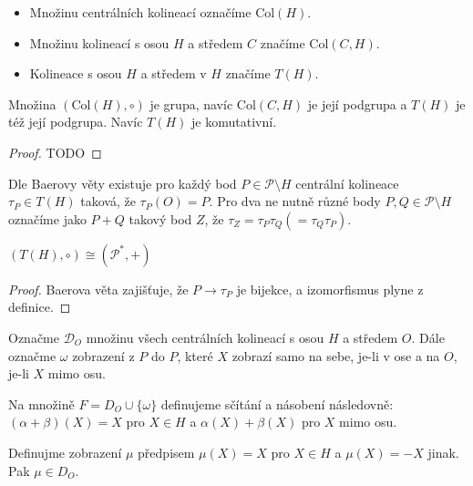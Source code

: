 \begin{definition}
    \begin{itemize}
        \item Množinu centrálních kolineací označíme $\mathrm{Col}(H)$.
        \item Množinu kolineací s osou $H$ a středem $C$ značíme $\mathrm{Col}(C,H)$.
        \item Kolineace s osou $H$ a středem v $H$ značíme $T(H)$.
    \end{itemize}
\end{definition}
\begin{theorem}
    Množina $(\mathrm{Col}(H), \circ)$ je grupa, navíc $\mathrm{Col}(C,H)$ je její podgrupa a $T(H)$ je též její podgrupa.
    Navíc $T(H)$ je komutativní.
\end{theorem}
\begin{proof}
    TODO
\end{proof}
\begin{definition}
    Dle Baerovy věty existuje pro každý bod $P\in\mathcal{P}\setminus H$ centrální kolineace $\tau_P\in T(H)$ taková, že $\tau_P(O)=P$.
    Pro dva ne nutně různé body $P,Q\in\mathcal{P}\setminus H$ označíme jako $P+Q$ takový bod $Z$, že $\tau_Z=\tau_P\tau_Q(=\tau_Q\tau_P)$.
\end{definition}
\begin{theorem}
    $(T(H),\circ)\cong(\mathcal{P}^*,+)$
\end{theorem}
\begin{proof}
    Baerova věta zajišťuje, že $P\rightarrow \tau_P$ je bijekce, a izomorfismus plyne z definice.
\end{proof}
\begin{definition}
    Označme $\mathcal{D}_O$ množinu všech centrálních kolineací s osou $H$ a středem $O$.
    Dále označme $\omega$ zobrazení z $P$ do $P$, které $X$ zobrazí samo na sebe, je-li v ose a na $O$, je-li $X$ mimo osu.

    Na množině $F=D_O\cup\{\omega\}$ definujeme sčítání a násobení následovně:
    $(\alpha+\beta)(X) = X$ pro $X\in H$ a $\alpha(X)+\beta(X)$ pro $X$ mimo osu.
\end{definition}
\begin{lemma}[O zobrazení $\mu$]
    Definujme zobrazení $\mu$ předpisem $\mu(X) = X$ pro $X\in H$ a $\mu(X) = -X$ jinak.
    Pak $\mu\in D_O$.
\end{lemma}
